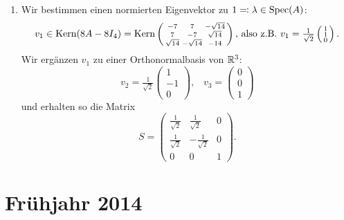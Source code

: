 \begin{enumerate}
	\item Wir bestimmen einen normierten Eigenvektor zu \( 1 \eqqcolon \lambda \in \text{Spec}(A) \):
	\begin{equation*}
		v_1 \in \text{Kern}(8A-8I_4) = \text{Kern}\left( \begin{smallmatrix}
			-7 & 7 & -\sqrt{14} \\
			7 & -7 & \sqrt{14} \\
			\sqrt{14} & -\sqrt{14} & -14
		\end{smallmatrix} \right)\text{, also z.B. } v_1 = \tfrac{1}{\sqrt{2}}\left( \begin{smallmatrix}
			1 \\ 1 \\ 0
		\end{smallmatrix} \right)\text{.}
	\end{equation*}
	Wir ergänzen \( v_1 \) zu einer Orthonormalbasis von \( \mathbb{R}^3 \): 
	\begin{equation*}
		v_2 = \tfrac{1}{\sqrt{2}}\left( \begin{smallmatrix}
			1 \\ -1 \\ 0
		\end{smallmatrix} \right)\text{,} \quad v_3 = \left( \begin{smallmatrix}
			0 \\ 0 \\ 1
		\end{smallmatrix} \right)
	\end{equation*}
	und erhalten so die Matrix
	\begin{equation*}
		S = \begin{pmatrix}
			\tfrac{1}{\sqrt{2}} & \tfrac{1}{\sqrt{2}} & 0 \\
			\tfrac{1}{\sqrt{2}} & -\tfrac{1}{\sqrt{2}} & 0 \\
			0 & 0 & 1
		\end{pmatrix}\text{.}
	\end{equation*}
\end{enumerate}

\newpage

\section{Frühjahr 2014}


